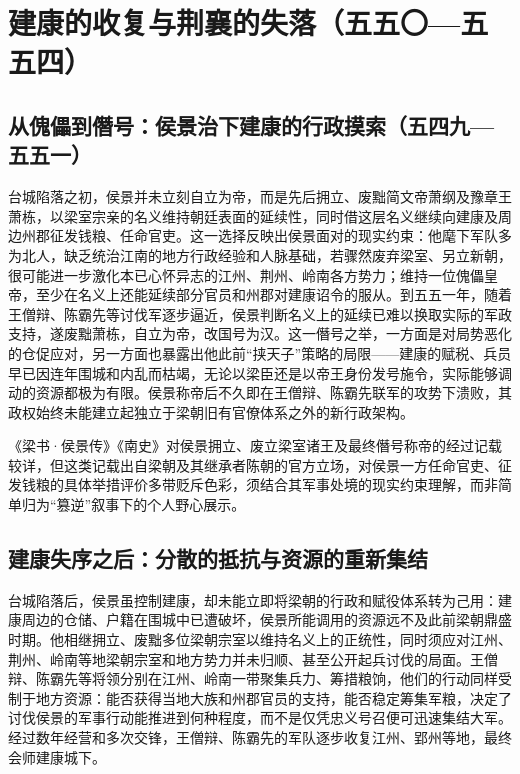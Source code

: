 \section{建康的收复与荆襄的失落（五五〇—五五四）}

\subsection{从傀儡到僭号：侯景治下建康的行政摸索（五四九—五五一）}

台城陷落之初，侯景并未立刻自立为帝，而是先后拥立、废黜简文帝萧纲及豫章王萧栋，以梁室宗亲的名义维持朝廷表面的延续性，同时借这层名义继续向建康及周边州郡征发钱粮、任命官吏。这一选择反映出侯景面对的现实约束：他麾下军队多为北人，缺乏统治江南的地方行政经验和人脉基础，若骤然废弃梁室、另立新朝，很可能进一步激化本已心怀异志的江州、荆州、岭南各方势力；维持一位傀儡皇帝，至少在名义上还能延续部分官员和州郡对建康诏令的服从。到五五一年，随着王僧辩、陈霸先等讨伐军逐步逼近，侯景判断名义上的延续已难以换取实际的军政支持，遂废黜萧栋，自立为帝，改国号为汉。这一僭号之举，一方面是对局势恶化的仓促应对，另一方面也暴露出他此前“挟天子”策略的局限——建康的赋税、兵员早已因连年围城和内乱而枯竭，无论以梁臣还是以帝王身份发号施令，实际能够调动的资源都极为有限。侯景称帝后不久即在王僧辩、陈霸先联军的攻势下溃败，其政权始终未能建立起独立于梁朝旧有官僚体系之外的新行政架构。

《梁书·侯景传》《南史》对侯景拥立、废立梁室诸王及最终僭号称帝的经过记载较详，但这类记载出自梁朝及其继承者陈朝的官方立场，对侯景一方任命官吏、征发钱粮的具体举措评价多带贬斥色彩，须结合其军事处境的现实约束理解，而非简单归为“篡逆”叙事下的个人野心展示。

\subsection{建康失序之后：分散的抵抗与资源的重新集结}

台城陷落后，侯景虽控制建康，却未能立即将梁朝的行政和赋役体系转为己用：建康周边的仓储、户籍在围城中已遭破坏，侯景所能调用的资源远不及此前梁朝鼎盛时期。他相继拥立、废黜多位梁朝宗室以维持名义上的正统性，同时须应对江州、荆州、岭南等地梁朝宗室和地方势力并未归顺、甚至公开起兵讨伐的局面。王僧辩、陈霸先等将领分别在江州、岭南一带聚集兵力、筹措粮饷，他们的行动同样受制于地方资源：能否获得当地大族和州郡官员的支持，能否稳定筹集军粮，决定了讨伐侯景的军事行动能推进到何种程度，而不是仅凭忠义号召便可迅速集结大军。经过数年经营和多次交锋，王僧辩、陈霸先的军队逐步收复江州、郢州等地，最终会师建康城下。


